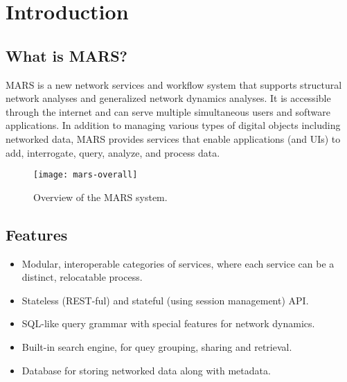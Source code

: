 

\section{Introduction}


\subsection{What is MARS?}
MARS is a new network services and workflow system that supports structural network analyses and generalized network dynamics analyses. It is accessible through the internet and can serve multiple simultaneous users and software applications. In addition to managing various types of digital objects including networked data, MARS
provides services that enable applications (and UIs) to add, interrogate, query, analyze, and process data.

\begin{figure}[H]
\centering
\texttt{[image: mars-overall]}
\caption{
Overview of the MARS system.
}   %
\label{fig:mars-overall}
\end{figure}

\subsection{Features}

\begin{itemize}
\item Modular, interoperable categories
of services, where each service can be a distinct, relocatable process.
\item Stateless (REST-ful) and stateful (using session management) API.
\item SQL-like query grammar with special features for network dynamics.
\item Built-in search engine, for quey grouping, sharing and retrieval.
\item Database for storing networked data along with metadata.

\end{itemize}



